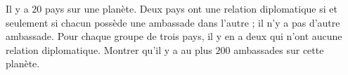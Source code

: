 Il y a $20$ pays sur une planète. Deux pays ont une relation diplomatique si et seulement si chacun possède une
ambassade dans l'autre ; il n'y a pas d'autre ambassade. Pour chaque groupe de trois pays, il y en
a deux qui n'ont aucune relation diplomatique. Montrer qu'il y a au plus
$200$ ambassades sur cette planète.
